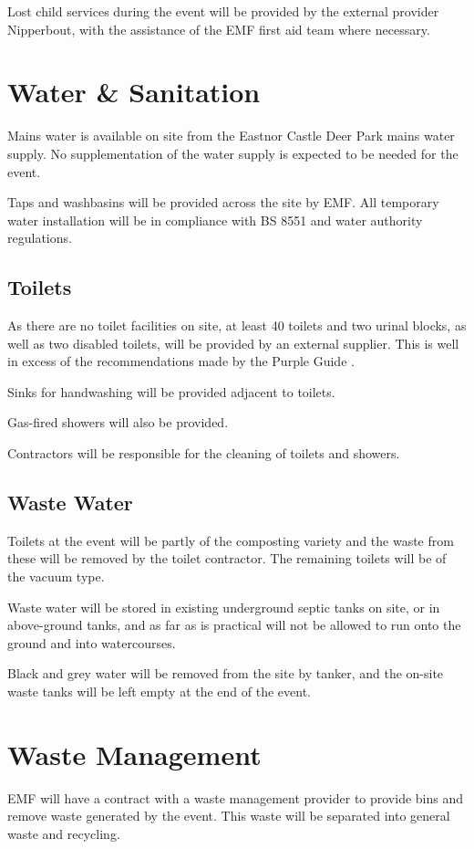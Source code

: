 Lost child services during the event will be provided by the external provider Nipperbout, with the
assistance of the EMF first aid team where necessary.

\section{Water \& Sanitation}\label{water}
Mains water is available on site from the Eastnor Castle Deer Park mains water supply. No
supplementation of the water supply is expected to be needed for the event.

Taps and washbasins will be provided across the site by EMF\@.
All temporary water installation will be in compliance with BS 8551 \cite{bs8551} and water
authority regulations.

\subsection{Toilets}

As there are no toilet facilities on site, at least 40 toilets and two urinal blocks,
as well as two disabled toilets, will be provided by an external supplier. This
is well in excess of the recommendations made by the Purple Guide \cite{purpleguide}.

Sinks for handwashing will be provided adjacent to toilets.

Gas-fired showers will also be provided.

Contractors will be responsible for the cleaning of toilets and showers.

\subsection{Waste Water}

Toilets at the event will be partly of the composting variety and the waste from these will be
removed by the toilet contractor. The remaining toilets will be of the vacuum type.

Waste water will be stored in existing underground septic tanks on site, or in above-ground tanks,
and as far as is practical will not be allowed to run onto the ground and into watercourses.

Black and grey water will be removed from the site by tanker, and the on-site waste tanks
will be left empty at the end of the event.

\section{Waste Management}
EMF will have a contract with a waste management provider to provide bins and remove waste
generated by the event. This waste will be separated into general waste and recycling.

